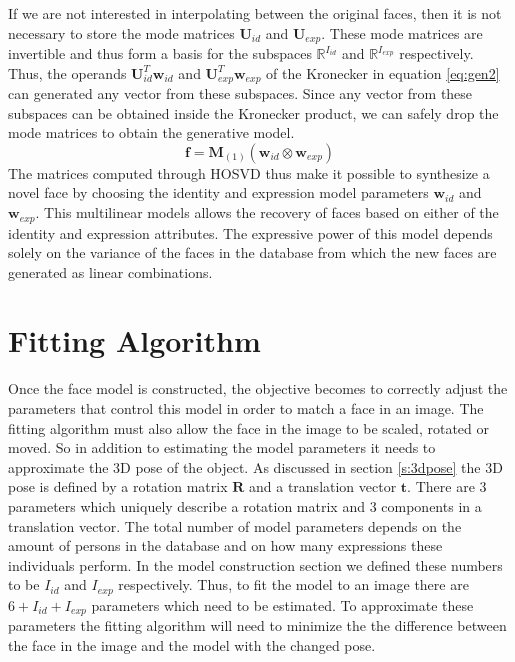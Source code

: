 \documentclass[11pt,a4paper]{report}
\begin{document}
If we are not interested in interpolating between the original faces, then it is
not necessary to store the mode matrices $\mathbf{U}_{id}$ and
$\mathbf{U}_{exp}$. These mode matrices are invertible and thus form a
basis for the subspaces $\mathbb{R}^{I_{id}}$ and $\mathbb{R}^{I_{exp}}$
respectively. Thus, the operands $\mathbf{U}_{id}^T\mathbf{w}_{id}$ and 
$\mathbf{U}_{exp}^T\mathbf{w}_{exp}$ of the Kronecker in equation \ref{eq:gen2}
can generated any vector from these subspaces. Since any vector from these
subspaces can be obtained inside the Kronecker product, we can safely drop the mode matrices to obtain the generative model.
\begin{equation}\label{eq:gen4}
\mathbf{f} = \mathbf{M}_{(1)}(\mathbf{w}_{id} \otimes \mathbf{w}_{exp})
\end{equation}
The matrices computed through HOSVD thus make it possible to synthesize a novel face by
choosing the identity and expression model parameters $\mathbf{w}_{id}$ and
$\mathbf{w}_{exp}$. This multilinear models allows the recovery of faces based
on either of the identity and expression attributes. The expressive power of this model depends solely on the
variance of the faces in the database from which the new faces are generated as linear
combinations. 

\section{Fitting Algorithm}
Once the face model is constructed, the objective becomes to correctly adjust the
parameters that control this model in order to match a face in an
image. The fitting algorithm must also allow the face in the image to be scaled,
rotated or moved. So in addition to estimating the model parameters it needs to
approximate the 3D pose of the object. As discussed in section \ref{s:3dpose}
the 3D pose is defined by a rotation matrix $\mathbf{R}$ and a translation
vector $\mathbf{t}$. There are 3 parameters which uniquely describe a rotation
matrix and 3 components in a translation vector. The total number of model parameters depends on
the amount of persons in the database and on how many expressions these
individuals perform. In the model construction section we defined these numbers
to be $I_{id}$ and $I_{exp}$ respectively. Thus, to fit the model to an image there
are $6+I_{id}+I_{exp}$ parameters which need to be estimated. To approximate
these parameters the fitting algorithm will need to minimize the the difference
between the face in the image and the model with the changed pose.
\end{document}
